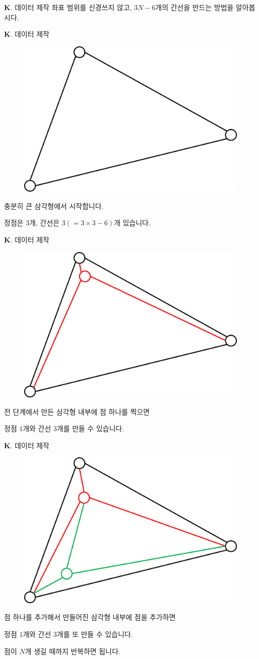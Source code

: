 \begin{frame}{\textbf{K}. 데이터 제작}
    좌표 범위를 신경쓰지 않고, $3N-6$개의 간선을 만드는 방법을 알아봅시다.
\end{frame}

\begin{frame}{\textbf{K}. 데이터 제작}
    \begin{figure}[h!]
        \centering
        \includegraphics[width=0.35\linewidth]{../images/v-e-f/sol1.png}
    \end{figure}
    
    충분히 큰 삼각형에서 시작합니다.
    
    정점은 $3$개, 간선은 $3(=3\times3-6)$개 있습니다.
\end{frame}

\begin{frame}{\textbf{K}. 데이터 제작}
    \begin{figure}[h!]
        \centering
        \includegraphics[width=0.35\linewidth]{../images/v-e-f/sol2.png}
    \end{figure}
    
    전 단계에서 만든 삼각형 내부에 점 하나를 찍으면
    
    정점 $1$개와 간선 $3$개를 만들 수 있습니다.
\end{frame}

\begin{frame}{\textbf{K}. 데이터 제작}
    \begin{figure}[h!]
        \centering
        \includegraphics[width=0.35\linewidth]{../images/v-e-f/sol3.png}
    \end{figure}
    
    점 하나를 추가해서 만들어진 삼각형 내부에 점을 추가하면
    
    정점 $1$개와 간선 $3$개를 또 만들 수 있습니다.
    
    \vspace{18pt}
    
    점이 $N$개 생길 때까지 반복하면 됩니다.
\end{frame}

